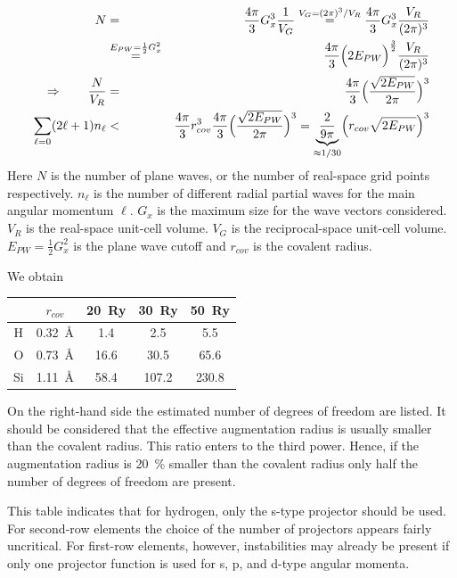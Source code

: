\documentclass[final,12pt,makeidx,DIV=calc]{article}
\begin{document}
{{{{{{\begin{eqnarray}
N&=&\frac{4\pi}{3}G_x^3\frac{1}{V_G}
\stackrel{V_G=(2\pi)^3/V_R}{=}
\frac{4\pi}{3}G_x^3\frac{V_R}{(2\pi)^3}
\nonumber\\
&\stackrel{E_{PW}=\frac{1}{2}G_x^2}{=}&
\frac{4\pi}{3}\Bigl(2 E_{PW}\Bigr)^\frac{3}{2}\frac{V_R}{(2\pi)^3}
\nonumber\\
\Rightarrow\qquad
\frac{N}{V_R}&=&\frac{4\pi}{3}\Bigl(
\frac{\sqrt{2E_{PW}}}{2\pi}
\Bigr)^3
\nonumber\\
\sum_{\ell=0}(2\ell+1)n_\ell&<&
\frac{4\pi}{3}r_{cov}^3\frac{4\pi}{3}\Bigl(
\frac{\sqrt{2E_{PW}}}{2\pi}
\Bigr)^3
=\underbrace{\frac{2}{9\pi}}_{\approx 1/30}\Bigl(r_{cov}\sqrt{2E_{PW}}\Bigr)^3
\end{eqnarray}
Here $N$ is the number of plane waves, or the number of real-space
grid points respectively. $n_\ell$ is the number of different radial
partial waves for the main angular momentum $\ell$.  $G_x$ is the
maximum size for the wave vectors considered. $V_R$ is the real-space
unit-cell volume. $V_G$ is the reciprocal-space unit-cell
volume. $E_{PW}=\frac{1}{2}G_x^2$ is the plane wave cutoff and
$r_{cov}$ is the covalent radius.


We obtain
\begin{center}
\begin{tabular}{|c|c|c|c|c|}
\hline
  &$r_{cov}$ & 20~Ry & 30~Ry & 50~Ry\\
\hline
H & 0.32~\AA &  1.4 & 2.5  &  5.5\\
O & 0.73~\AA & 16.6 & 30.5 & 65.6\\ 
Si& 1.11~\AA & 58.4 & 107.2 & 230.8\\
\hline
\end{tabular}
\end{center}
On the right-hand side the estimated number of degrees of freedom are
listed. It should be considered that the effective augmentation radius
is usually smaller than the covalent radius. This ratio enters to the
third power. Hence, if the augmentation radius is 20~\% smaller than
the covalent radius only half the number of degrees of freedom are
present.

This table indicates that for hydrogen, only the s-type projector
should be used. For second-row elements the choice of the number of
projectors appears fairly uncritical. For first-row elements, however,
instabilities may already be present if only one projector function
is used for s, p, and d-type angular momenta.


\newpage
}}}}}}
\end{document}
